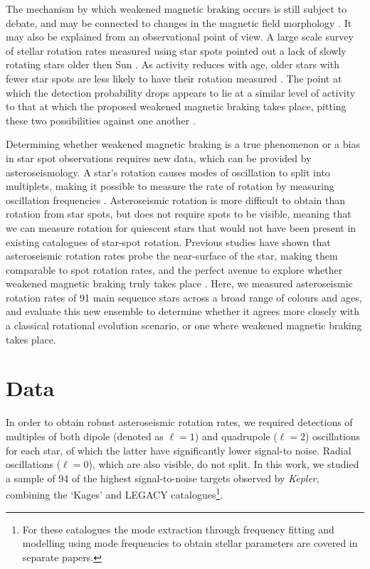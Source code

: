 \documentclass[12pt]{article}
\begin{document}
The mechanism by which weakened magnetic braking occurs is  still subject to debate, and may be connected to changes in the magnetic field morphology \cite{reville+2015,garraffo+2016, metcalfe+2019, see+2019}. It may also be explained from an observational point of view. A large scale survey of stellar rotation rates measured using star spots pointed out a lack of slowly rotating stars older then Sun \cite{mcquillan+2014}. As activity reduces with age, older stars with fewer star spots are less likely to have their rotation measured \cite{matt+2015}. The point at which the detection probability drops appears to lie at a similar level of activity to that at which the proposed weakened magnetic braking takes place, pitting these two possibilities against one another \cite{vansaders+2019}.

Determining whether weakened magnetic braking is a true phenomenon or a bias in star spot observations requires new data, which can be provided by asteroseismology. A star's rotation causes modes of oscillation to split into multiplets, making it possible to measure the rate of rotation by measuring oscillation frequencies \cite{ledoux1951}. Asteroseismic rotation is more difficult to obtain than rotation from star spots, but does not require  spots to be visible, meaning that we can measure rotation for quiescent stars that would not have been present in existing catalogues of star-spot rotation. Previous studies have shown that asteroseismic rotation rates probe the near-surface of the star, making them comparable to spot rotation rates, and the perfect avenue to explore whether weakened magnetic braking truly takes place \cite{lund+2014, benomar+2015}. Here, we measured asteroseismic rotation rates of 91 main sequence stars across a broad range of colours and ages, and evaluate this new ensemble to determine whether it agrees more closely with a classical rotational evolution scenario, or one where weakened magnetic braking takes place.

\section{Data}

In order to obtain robust asteroseismic rotation rates, we required detections of multiples of both dipole (denoted as $\ell = 1$) and quadrupole ($\ell = 2$) oscillations for each star, of which the latter have significantly lower signal-to noise. Radial oscillations ($\ell = 0$), which are also visible, do not split. In this work, we studied a sample of 94 of the highest signal-to-noise targets observed by \textit{Kepler}, combining the `Kages' \cite{silvaaguirre+2015,davies+2016} and LEGACY \cite{lund+2017, silvaaguirre+2017} catalogues\footnote{For these catalogues the mode extraction through frequency fitting \cite{davies+2016, lund+2017} and modelling using mode frequencies to obtain stellar parameters \cite{silvaaguirre+2015, silvaaguirre+2017} are covered in separate papers.}. 
\end{document}
